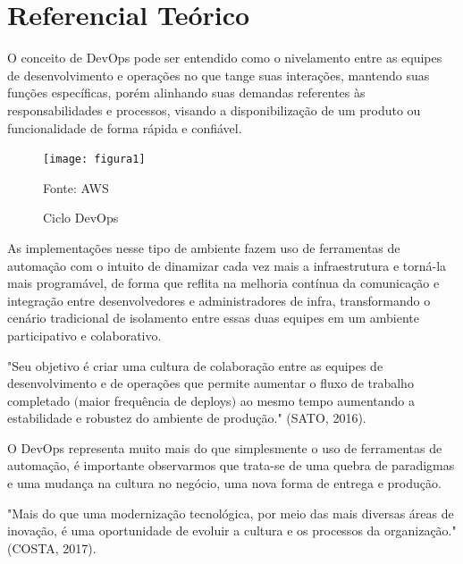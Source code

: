 

\chapter{Referencial Teórico}\label{referencial_teorico}


O conceito de DevOps pode ser entendido como o nivelamento entre as equipes de desenvolvimento e operações no que tange suas interações, mantendo suas funções específicas, porém alinhando suas demandas referentes às responsabilidades e processos, visando a disponibilização de um produto ou funcionalidade de forma rápida e confiável.

\begin{figure}[htb] %
	\centering
	\texttt{[image: figura1]}
	\caption{Ciclo DevOps}
	Fonte: AWS
	\label{fig:figura1}
\end{figure}

As implementações nesse tipo de ambiente fazem uso de ferramentas de automação com o intuito de dinamizar cada vez mais a infraestrutura e torná-la mais programável, de forma que reflita na melhoria contínua da comunicação e integração entre desenvolvedores e administradores de infra, transformando o cenário tradicional de isolamento entre essas duas equipes em um ambiente participativo e colaborativo.

			\begin{flushright}
				\begin{minipage}{0.75\textwidth}
					\normalsize "Seu objetivo é criar uma cultura de colaboração entre as equipes de desenvolvimento e de operações que permite aumentar o fluxo de trabalho completado $($maior frequência de deploys$)$ ao mesmo tempo aumentando a estabilidade e robustez do ambiente de produção." (SATO, 2016).
				\end{minipage}
			\end{flushright}


O DevOps representa muito mais do que simplesmente o uso de ferramentas de automação, é importante observarmos que trata-se de uma quebra de paradigmas e uma mudança na cultura no negócio, uma nova forma de entrega e produção.

			\begin{flushright}
				\begin{minipage}{0.75\textwidth}
					\normalsize "Mais do que uma modernização tecnológica, por meio das mais diversas áreas de inovação, é uma oportunidade de evoluir a cultura e os processos da organização." (COSTA, 2017).
				\end{minipage}
			\end{flushright}

